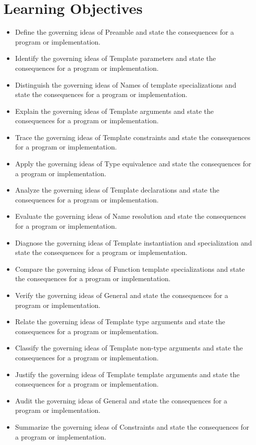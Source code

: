 \documentclass[11pt,letterpaper]{article}
\begin{document}
\section{Learning Objectives}
\begin{itemize}[label=\textcolor{CornellReferenceTeal}{$\blacktriangleright$}]
\item Define the governing ideas of Preamble and state the consequences for a program or implementation.
\item Identify the governing ideas of Template parameters and state the consequences for a program or implementation.
\item Distinguish the governing ideas of Names of template specializations and state the consequences for a program or implementation.
\item Explain the governing ideas of Template arguments and state the consequences for a program or implementation.
\item Trace the governing ideas of Template constraints and state the consequences for a program or implementation.
\item Apply the governing ideas of Type equivalence and state the consequences for a program or implementation.
\item Analyze the governing ideas of Template declarations and state the consequences for a program or implementation.
\item Evaluate the governing ideas of Name resolution and state the consequences for a program or implementation.
\item Diagnose the governing ideas of Template instantiation and specialization and state the consequences for a program or implementation.
\item Compare the governing ideas of Function template specializations and state the consequences for a program or implementation.
\item Verify the governing ideas of General and state the consequences for a program or implementation.
\item Relate the governing ideas of Template type arguments and state the consequences for a program or implementation.
\item Classify the governing ideas of Template non-type arguments and state the consequences for a program or implementation.
\item Justify the governing ideas of Template template arguments and state the consequences for a program or implementation.
\item Audit the governing ideas of General and state the consequences for a program or implementation.
\item Summarize the governing ideas of Constraints and state the consequences for a program or implementation.
\end{itemize}
\end{document}
